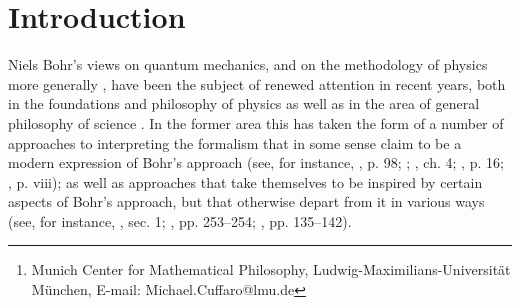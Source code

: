 \documentclass[12pt,english,twoside]{article}
\title{\documentTitle}
\author{Michael E. Cuffaro\footnote{Munich Center for Mathematical Philosophy,
      Ludwig-Maximilians-Universit\"at M\"unchen,
      E-mail: Michael.Cuffaro@lmu.de}}
\numberwithin{equation}{section}
\begin{document}
\maketitle

\thispagestyle{empty}

\begin{abstract}
  I flesh out the sense in which the informational approach to interpreting quantum mechanics, as defended by Pitowsky and Bub and lately by a number of other authors, is (neo-)Bohrian. I argue that on this approach, quantum mechanics represents what Bohr called a ``natural generalisation of the ordinary causal description'' in the sense that the idea (which philosophers of science like Stein have argued for on the grounds of practical necessity), that understanding a theory as a theory of physics requires that we be able to ``schematise the observer'' within it, is elevated in quantum mechanics to the level of a postulate. I argue that the approach's central concern is with the methodological question of how to assign physical properties to what one takes to be a system in a given experimental context, rather than the metaphysical question of what a given state vector represents independently of any context, and I show how the quantum generalisation of the concept of an open system may be used to assuage Einstein's complaint that the orthodox approach to quantum mechanics runs afoul of the supposedly fundamental methodological requirement to the effect that one must always be able, according to Einstein, to treat spatially separated systems as isolated from one another.
\end{abstract}

\section{Introduction}
\label{s:introduction}

Niels Bohr's views on quantum mechanics, and on the methodology of physics more generally \citep[]{demopoulosOnTheories, perovic2021}, have been the subject of renewed attention in recent years, both in the foundations and philosophy of physics as well as in the area of general philosophy of science \citep[see, for instance,][]{evans2020}. In the former area this has taken the form of a number of approaches to interpreting the formalism that in some sense claim to be a modern expression of Bohr's approach (see, for instance, \citealt{brukner2017}, p. 98; \citealt{bub2017}; \citealt{demopoulosOnTheories}, ch. 4; \citealt{3m2020}, p. 16; \citealt{landsman2017}, p. viii); as well as approaches that take themselves to be inspired by certain aspects of Bohr's approach, but that otherwise depart from it in various ways (see, for instance, \citealt{fuchs2017}, sec. 1; \citealt{healey2017}, pp. 253--254; \citealt{rovelli2021}, pp. 135--142).
\end{document}
